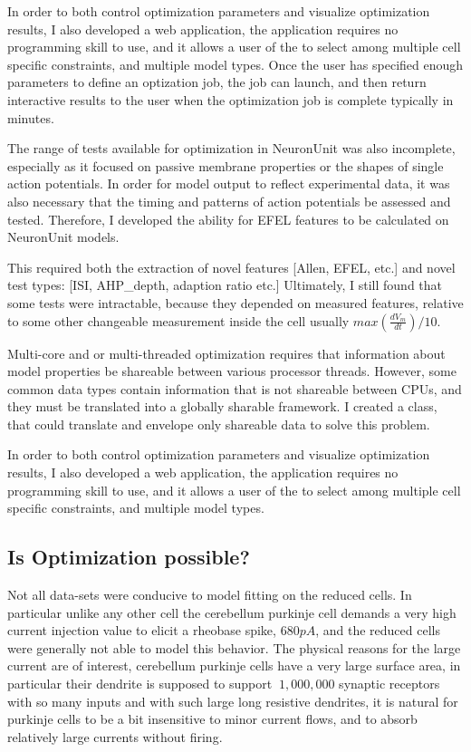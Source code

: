 In order to both control optimization parameters and visualize optimization results, I also developed a web application, the application requires no programming skill to use, and it allows a user of the to select among multiple cell specific constraints, and multiple model types. Once the user has specified enough parameters to define an optization job, the job can launch, and then return interactive results to the user when the optimization job is complete typically in minutes.


The range of tests available for optimization in NeuronUnit was also incomplete, especially as it focused on passive membrane properties or the shapes of single action potentials.  In order for model output to reflect experimental data, it was also necessary that the timing and patterns of action potentials be assessed and tested.  Therefore, I developed the ability for EFEL features to be calculated on NeuronUnit models. 

This required both the extraction of novel features [Allen, EFEL, etc.] and novel test types: [ISI, AHP\_depth, adaption ratio etc.] Ultimately, I still found that some tests were intractable, because they depended on measured features, relative to some other changeable measurement inside the cell usually $max(\frac{dV_{m}}{dt})/10.$

Multi-core and or multi-threaded optimization requires that information about model properties be shareable between various processor threads. However, some common data types contain information that is not shareable between CPUs, and they must be translated into a globally sharable framework. I created a class, that could translate and envelope only shareable data to solve this problem.

In order to both control optimization parameters and visualize optimization results, I also developed a web application, the application requires no programming skill to use, and it allows a user of the to select among multiple cell specific constraints, and multiple model types. 
%


\subsection{Is Optimization possible?}
Not all data-sets were conducive to model fitting on the reduced cells. In particular unlike any other cell the cerebellum purkinje cell demands a very high current injection value to elicit a rheobase spike, $680pA$, and the reduced cells were generally not able to model this behavior. The physical reasons for the large current are of interest, cerebellum purkinje cells have a very large surface area, in particular their dendrite is supposed to support $~1,000,000 $ synaptic receptors with so many inputs and with such large long resistive dendrites, it is natural for purkinje cells to be a bit insensitive to minor current flows, and to absorb relatively large currents without firing.

